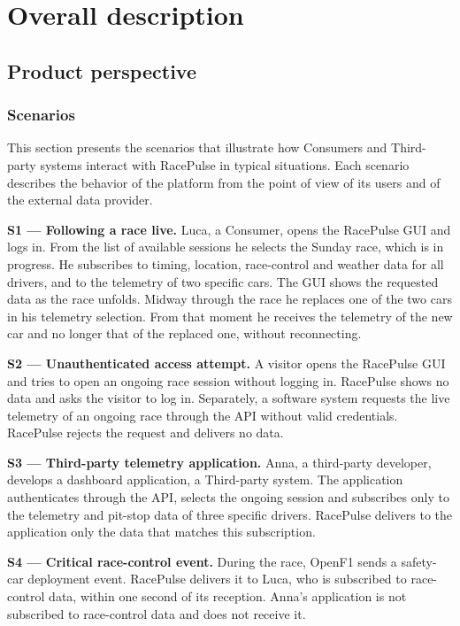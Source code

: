 \documentclass[11pt,a4paper]{article}
\newcommand{\RP}{RacePulse}
\begin{document}
\clearpage
\section{Overall description}

\subsection{Product perspective}

\subsubsection{Scenarios}
This section presents the scenarios that illustrate how Consumers and Third-party systems interact with \RP{}
in typical situations. Each scenario describes the behavior of the platform from the point of view of its users
and of the external data provider.

\textbf{S1 --- Following a race live.} Luca, a Consumer, opens the \RP{} GUI and logs in. From the list of
available sessions he selects the Sunday race, which is in progress. He subscribes to timing, location,
race-control and weather data for all drivers, and to the telemetry of two specific cars. The GUI shows the
requested data as the race unfolds. Midway through the race he replaces one of the two cars in his telemetry
selection. From that moment he receives the telemetry of the new car and no longer that of the replaced one,
without reconnecting.

\textbf{S2 --- Unauthenticated access attempt.} A visitor opens the \RP{} GUI and tries to open an ongoing race
session without logging in. \RP{} shows no data and asks the visitor to log in. Separately, a software system
requests the live telemetry of an ongoing race through the API without valid credentials. \RP{} rejects the
request and delivers no data.

\textbf{S3 --- Third-party telemetry application.} Anna, a third-party developer, develops a dashboard
application, a Third-party system. The application authenticates through the API, selects the ongoing session and
subscribes only to the telemetry and pit-stop data of three specific drivers. \RP{} delivers to the application
only the data that matches this subscription.

\textbf{S4 --- Critical race-control event.} During the race, OpenF1 sends a safety-car deployment event. \RP{}
delivers it to Luca, who is subscribed to race-control data, within one second of its reception. Anna's
application is not subscribed to race-control data and does not receive it.
\end{document}
